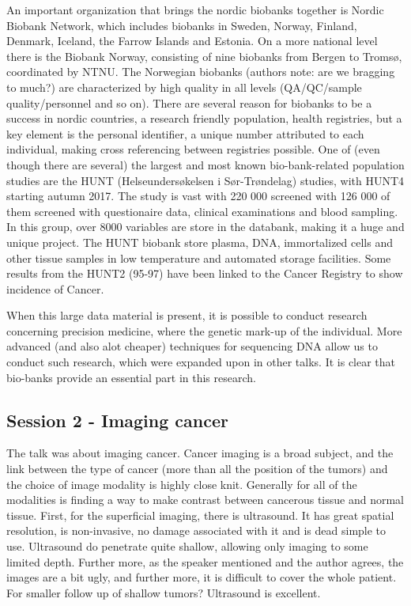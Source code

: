 \documentclass[12p]{article}
\begin{document}
An important organization that brings the nordic biobanks together is Nordic Biobank Network, which includes biobanks in Sweden, Norway, Finland, Denmark, Iceland, the Farrow Islands and Estonia.
On a more national level there is the Biobank Norway, consisting of nine biobanks from Bergen to Tromsø, coordinated by NTNU.
The Norwegian biobanks (authors note: are we bragging to much?) are characterized by high quality in all levels (QA/QC/sample quality/personnel and so on).
There are several reason for biobanks to be a success in nordic countries, a research friendly population, health registries, but a key element is the personal identifier, a unique number attributed to each individual, making cross referencing between registries possible.
One of (even though there are several) the largest and most known bio-bank-related population studies are the HUNT (Helseundersøkelsen i Sør-Trøndelag) studies, with HUNT4 starting autumn 2017.
The study is vast with 220 000 screened with 126 000 of them screened with questionaire data, clinical examinations and blood sampling.
In this group, over 8000 variables are store in the databank, making it a huge and unique project.
The HUNT biobank store plasma, DNA, immortalized cells and other tissue samples in low temperature and automated storage facilities.
Some results from the HUNT2 (95-97) have been linked to the Cancer Registry to show incidence of Cancer.

When this large data material is present, it is possible to conduct research concerning precision medicine, where the genetic mark-up of the individual.
More advanced (and also alot cheaper) techniques for sequencing DNA allow us to conduct such research, which were expanded upon in other talks.
It is clear that bio-banks provide an essential part in this research.

\subsection*{Session 2 - Imaging cancer}

The talk was about imaging cancer.
Cancer imaging is a broad subject, and the link between the type of cancer (more than all the position of the tumors) and the choice of image modality is highly close knit.
Generally for all of the modalities is finding a way to make contrast between cancerous tissue and normal tissue.
First, for the superficial imaging, there is ultrasound.
It has great spatial resolution, is non-invasive, no damage associated with it and is dead simple to use.
Ultrasound do penetrate quite shallow, allowing only imaging to some limited depth.
Further more, as the speaker mentioned and the author agrees, the images are a bit ugly, and further more, it is difficult to cover the whole patient.
For smaller follow up of shallow tumors? Ultrasound is excellent.
\end{document}
